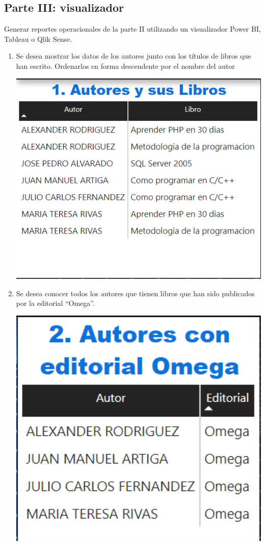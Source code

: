 \documentclass[12pt,letterpaper]{article}
\newcommand\tab[1][1cm]{\hspace*{#1}}
\begin{document}
    \subsection{Parte III: visualizador}
    Generar reportes operacionales de la parte II utilizando un visualizador Power BI, Tableau o Qlik Sense.
    \begin{enumerate}[\tab 1.]
        \item Se desea mostrar los datos de los autores junto con los títulos de libros que han escrito. Ordenarlos en forma descendente por el nombre del autor
        \begin{center}
            \includegraphics[width=13cm]{./img/img13.png}
        \end{center}
        \item Se desea conocer todos los autores que tienen libros que han sido publicados por la editorial “Omega”.
        \begin{center}
            \includegraphics[width=13cm]{./img/img14.png}

\end{center}
\end{enumerate}
\end{document}
